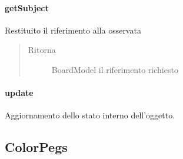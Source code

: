 \documentclass[letterpaper,10pt,italian,openany,oneside]{sphinxmanual}
\begin{document}
\paragraph{getSubject}
\label{\detokenize{source/it/unicam/cs/pa/mastermind/gamecore/BoardObserver:getsubject}}

\begin{fulllineitems}
\label{\detokenize{source/it/unicam/cs/pa/mastermind/gamecore/BoardObserver:it.unicam.cs.pa.mastermind.gamecore.BoardObserver.getSubject()}}
Restituito il riferimento alla  osservata
\begin{quote}\begin{description}
\item[{Ritorna}] \leavevmode
BoardModel il riferimento richiesto

\end{description}\end{quote}

\end{fulllineitems}



\paragraph{update}
\label{\detokenize{source/it/unicam/cs/pa/mastermind/gamecore/BoardObserver:update}}

\begin{fulllineitems}
\label{\detokenize{source/it/unicam/cs/pa/mastermind/gamecore/BoardObserver:it.unicam.cs.pa.mastermind.gamecore.BoardObserver.update()}}
Aggiornamento dello stato interno dell’oggetto.

\end{fulllineitems}



\subsection{ColorPegs}
\label{\detokenize{source/it/unicam/cs/pa/mastermind/gamecore/ColorPegs:colorpegs}}\label{\detokenize{source/it/unicam/cs/pa/mastermind/gamecore/ColorPegs::doc}}
\end{document}
